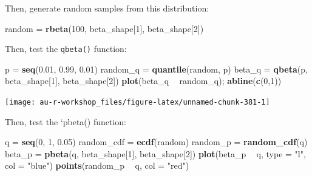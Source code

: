 \documentclass[]{book}
\newenvironment{Shaded}{\begin{snugshade}}{\end{snugshade}}
\newcommand{\KeywordTok}[1]{\textcolor[rgb]{0.13,0.29,0.53}{\textbf{#1}}}
\newcommand{\DataTypeTok}[1]{\textcolor[rgb]{0.13,0.29,0.53}{#1}}
\newcommand{\DecValTok}[1]{\textcolor[rgb]{0.00,0.00,0.81}{#1}}
\newcommand{\FloatTok}[1]{\textcolor[rgb]{0.00,0.00,0.81}{#1}}
\newcommand{\StringTok}[1]{\textcolor[rgb]{0.31,0.60,0.02}{#1}}
\newcommand{\OperatorTok}[1]{\textcolor[rgb]{0.81,0.36,0.00}{\textbf{#1}}}
\newcommand{\NormalTok}[1]{#1}
\theoremstyle{definition}
\theoremstyle{definition}
\theoremstyle{definition}
\theoremstyle{remark}
\begin{document}
Then, generate random samples from this distribution:

\begin{Shaded}
\begin{Highlighting}[]
\NormalTok{random =}\StringTok{ }\KeywordTok{rbeta}\NormalTok{(}\DecValTok{100}\NormalTok{, beta_shape[}\DecValTok{1}\NormalTok{], beta_shape[}\DecValTok{2}\NormalTok{])}
\end{Highlighting}
\end{Shaded}

Then, test the \texttt{qbeta()} function:

\begin{Shaded}
\begin{Highlighting}[]
\NormalTok{p =}\StringTok{ }\KeywordTok{seq}\NormalTok{(}\FloatTok{0.01}\NormalTok{, }\FloatTok{0.99}\NormalTok{, }\FloatTok{0.01}\NormalTok{)}
\NormalTok{random_q =}\StringTok{ }\KeywordTok{quantile}\NormalTok{(random, p)}
\NormalTok{beta_q =}\StringTok{ }\KeywordTok{qbeta}\NormalTok{(p, beta_shape[}\DecValTok{1}\NormalTok{], beta_shape[}\DecValTok{2}\NormalTok{])}
\KeywordTok{plot}\NormalTok{(beta_q }\OperatorTok{~}\StringTok{ }\NormalTok{random_q); }\KeywordTok{abline}\NormalTok{(}\KeywordTok{c}\NormalTok{(}\DecValTok{0}\NormalTok{,}\DecValTok{1}\NormalTok{))}
\end{Highlighting}
\end{Shaded}

\begin{center}\texttt{[image: au-r-workshop\_files/figure-latex/unnamed-chunk-381-1]} \end{center}

Then, test the `pbeta() function:

\begin{Shaded}
\begin{Highlighting}[]
\NormalTok{q =}\StringTok{ }\KeywordTok{seq}\NormalTok{(}\DecValTok{0}\NormalTok{, }\DecValTok{1}\NormalTok{, }\FloatTok{0.05}\NormalTok{)}
\NormalTok{random_cdf =}\StringTok{ }\KeywordTok{ecdf}\NormalTok{(random)}
\NormalTok{random_p =}\StringTok{ }\KeywordTok{random_cdf}\NormalTok{(q)}
\NormalTok{beta_p =}\StringTok{ }\KeywordTok{pbeta}\NormalTok{(q, beta_shape[}\DecValTok{1}\NormalTok{], beta_shape[}\DecValTok{2}\NormalTok{])}
\KeywordTok{plot}\NormalTok{(beta_p }\OperatorTok{~}\StringTok{ }\NormalTok{q, }\DataTypeTok{type =} \StringTok{"l"}\NormalTok{, }\DataTypeTok{col =} \StringTok{"blue"}\NormalTok{)}
\KeywordTok{points}\NormalTok{(random_p }\OperatorTok{~}\StringTok{ }\NormalTok{q, }\DataTypeTok{col =} \StringTok{"red"}\NormalTok{)}
\end{Highlighting}
\end{Shaded}
\end{document}
